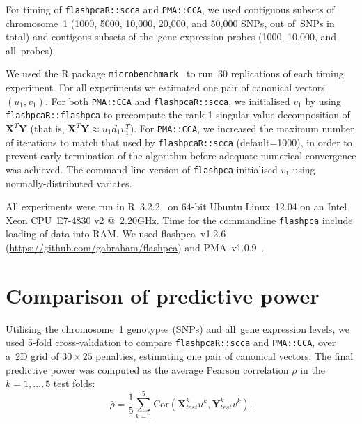 \documentclass[a4paper,12pt]{article}
\begin{document}
For timing of \texttt{flashpcaR::scca} and \texttt{PMA::CCA}, we used contiguous
subsets of chromosome~1 (1000, 5000, 10,000, 20,000, and 50,000 SNPs, out
of~\ngenes SNPs in total) and contigous subsets of the~\ngenes gene expression
probes (1000, 10,000, and all~\ngenes probes).

We used the \textsf{R} package \texttt{microbenchmark}~\citep{Mersmann2015}
to run~30 replications of each timing experiment.  For all
experiments we estimated one pair of canonical vectors $(u_1,
v_1)$.  For both \texttt{PMA::CCA} and \texttt{flashpcaR::scca}, 
we initialised $v_1$ by using
\texttt{flashpcaR::flashpca} to precompute the rank-1 singular value
decomposition of $\mathbf{X}^T \mathbf{Y}$ (that is, $\mathbf{X}^T \mathbf{Y}
\approx u_1 d_1 v_1^T$).
For \texttt{PMA::CCA}, we increased
the maximum number of iterations to match that used by \texttt{flashpcaR::scca}
(default=1000), in order to prevent early termination of the algorithm before
adequate numerical convergence was achieved. The command-line version of
\texttt{flashpca} initialised $v_1$ using normally-distributed variates.

All experiments were run in \textsf{R}~3.2.2~\citep{R} on 64-bit Ubuntu
Linux~12.04 on an Intel Xeon CPU~E7-4830 v2 @~2.20GHz. Time for the commandline
\texttt{flashpca} include loading of data into RAM. We used flashpca~v1.2.6
(\url{https://github.com/gabraham/flashpca}) and PMA~v1.0.9~\citep{Witten2013}.

\section{Comparison of predictive power}

Utilising the chromosome~1 genotypes (\nsnpschr SNPs) and all~\ngenes gene
expression levels, we used 5-fold cross-validation to compare
\texttt{flashpcaR::scca} and \texttt{PMA::CCA}, over a~2D grid of $30\times25$
penalties, estimating one pair of canonical vectors. The final predictive power
was computed as the average Pearson correlation
$\bar{\rho}$ in the~$k=1,\hdots,5$ test folds:
$$
\bar{\rho} = \frac{1}{5} \sum_{k=1}^5
   \mbox{Cor}(\mathbf{X}_{test}^k u^k, \mathbf{Y}_{test}^k v^k).
$$



\end{document}
